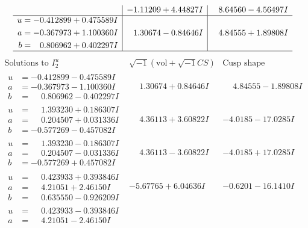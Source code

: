 \documentclass[1p]{elsarticle_modified}
\theoremstyle{definition}
\newcommand{\I}{\sqrt{-1}}
\begin{document}
$$\begin{array}{c|c|c}
 & -1.11209 + 4.44827 I & \phantom{-}8.64560 - 4.56497 I \\ \hline\begin{aligned}
u &= -0.412899 + 0.475589 I \\
a &= -0.367973 + 1.100360 I \\
b &= \phantom{-}0.806962 + 0.402297 I\end{aligned}
 & \phantom{-}1.30674 - 0.84646 I & \phantom{-}4.84555 + 1.89808 I\\
 \hline 
 \end{array}$$\newpage$$\begin{array}{c|c|c}  
\text{Solutions to }I^u_{2}& \I (\text{vol} + \sqrt{-1}CS) & \text{Cusp shape}\\
 \hline 
\begin{aligned}
u &= -0.412899 - 0.475589 I \\
a &= -0.367973 - 1.100360 I \\
b &= \phantom{-}0.806962 - 0.402297 I\end{aligned}
 & \phantom{-}1.30674 + 0.84646 I & \phantom{-}4.84555 - 1.89808 I \\ \hline\begin{aligned}
u &= \phantom{-}1.393230 + 0.186307 I \\
a &= \phantom{-}0.204507 + 0.031336 I \\
b &= -0.577269 - 0.457082 I\end{aligned}
 & \phantom{-}4.36113 + 3.60822 I & -4.0185 - 17.0285 I \\ \hline\begin{aligned}
u &= \phantom{-}1.393230 - 0.186307 I \\
a &= \phantom{-}0.204507 - 0.031336 I \\
b &= -0.577269 + 0.457082 I\end{aligned}
 & \phantom{-}4.36113 - 3.60822 I & -4.0185 + 17.0285 I \\ \hline\begin{aligned}
u &= \phantom{-}0.423933 + 0.393846 I \\
a &= \phantom{-}4.21051 + 2.46150 I \\
b &= \phantom{-}0.635550 - 0.926209 I\end{aligned}
 & -5.67765 + 6.04636 I & -0.6201 - 16.1410 I \\ \hline\begin{aligned}
u &= \phantom{-}0.423933 - 0.393846 I \\
a &= \phantom{-}4.21051 - 2.46150 I \\

\end{aligned}
\end{array}$$
\end{document}
